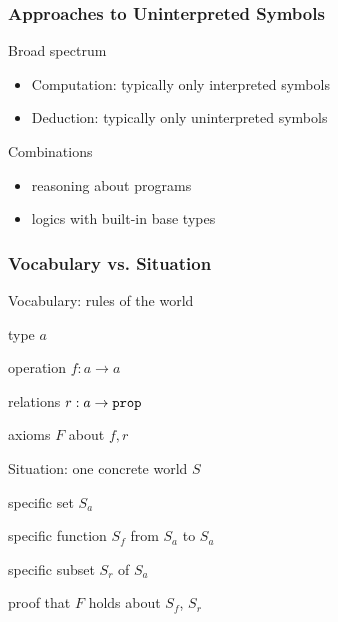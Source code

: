 \begin{frame}\frametitle{Approaches to Uninterpreted Symbols}
Broad spectrum
\begin{itemize}
\item Computation: typically only interpreted symbols
\item Deduction: typically only uninterpreted symbols
\end{itemize}

Combinations
\begin{itemize}
\item reasoning about programs 
\item logics with built-in base types
\end{itemize}
\end{frame}

\begin{frame}\frametitle{Vocabulary vs. Situation}
\begin{blockitems}{Vocabulary: rules of the world}
\item type $a$
\item operation $f:a\to a$
\item relations $r:a\to \prop$
\item axioms $F$ about $f,r$
\end{blockitems}

\begin{blockitems}{Situation: one concrete world $S$}
\item specific set $S_a$
\item specific function $S_f$ from $S_a$ to $S_a$
\item specific subset $S_r$ of $S_a$
\item proof that $F$ holds about $S_f$, $S_r$
\end{blockitems}
\end{frame}

